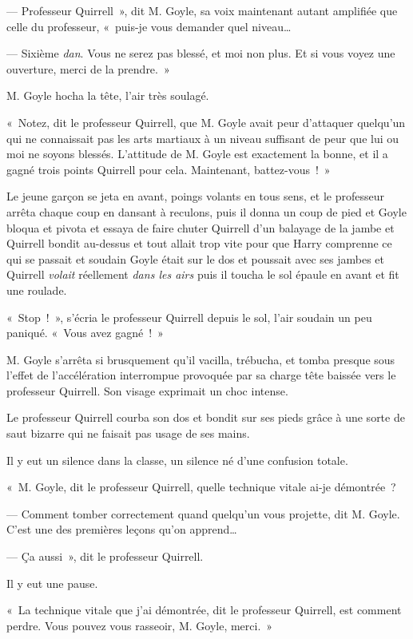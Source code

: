 --- Professeur Quirrell~», dit M. Goyle, sa voix maintenant autant amplifiée que celle du professeur, «~puis-je vous demander quel niveau…

--- Sixième \emph{dan}. Vous ne serez pas blessé, et moi non plus. Et si vous voyez une ouverture, merci de la prendre.~»

M. Goyle hocha la tête, l'air très soulagé.

«~Notez, dit le professeur Quirrell, que M. Goyle avait peur d'attaquer quelqu'un qui ne connaissait pas les arts martiaux à un niveau suffisant de peur que lui ou moi ne soyons blessés. L'attitude de M. Goyle est exactement la bonne, et il a gagné trois points Quirrell pour cela. Maintenant, battez-vous~!~»

Le jeune garçon se jeta en avant, poings volants en tous sens, et le professeur arrêta chaque coup en dansant à reculons, puis il donna un coup de pied et Goyle bloqua et pivota et essaya de faire chuter Quirrell d'un balayage de la jambe et Quirrell bondit au-dessus et tout allait trop vite pour que Harry comprenne ce qui se passait et soudain Goyle était sur le dos et poussait avec ses jambes et Quirrell \emph{volait} réellement \emph{dans les airs} puis il toucha le sol épaule en avant et fit une roulade.

«~Stop~!~», s'écria le professeur Quirrell depuis le sol, l'air soudain un peu paniqué. «~Vous avez gagné~!~»

M. Goyle s'arrêta si brusquement qu'il vacilla, trébucha, et tomba presque sous l'effet de l'accélération interrompue provoquée par sa charge tête baissée vers le professeur Quirrell. Son visage exprimait un choc intense.

Le professeur Quirrell courba son dos et bondit sur ses pieds grâce à une sorte de saut bizarre qui ne faisait pas usage de ses mains.

Il y eut un silence dans la classe, un silence né d'une confusion totale.

«~M. Goyle, dit le professeur Quirrell, quelle technique vitale ai-je démontrée~?

--- Comment tomber correctement quand quelqu'un vous projette, dit M. Goyle. C'est une des premières leçons qu'on apprend…

--- Ça aussi~», dit le professeur Quirrell.

Il y eut une pause.

«~La technique vitale que j'ai démontrée, dit le professeur Quirrell, est comment perdre. Vous pouvez vous rasseoir, M. Goyle, merci.~»

